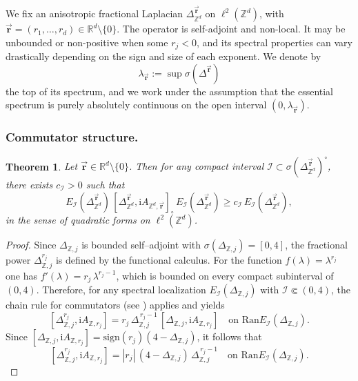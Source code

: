 \documentclass[10pt]{amsart} %
\newcommand{\Z}{{\mathbb{Z}}}
\newcommand{\1}{{\mathbb{I}}}
\newcommand{\Ic}{\mathcal{I}}
\newcommand{\Ran}{\mathrm{Ran}}
\numberwithin{equation}{section}
\newtheorem{theorem}{Theorem}[section]%
\begin{document}
We fix an anisotropic fractional Laplacian \( \Delta_{\mathbb{Z}^d}^{\vec{\mathbf{r}}} \) on \( \ell^2(\mathbb{Z}^d) \), with \( \vec{\mathbf{r}} = (r_1, \dots, r_d) \in \mathbb{R}^d \setminus \{0\} \). The operator is self-adjoint and non-local. It may be unbounded or non-positive when some \( r_j < 0 \), and its spectral properties can vary drastically depending on the sign and size of each exponent. We denote by
\[
\lambda_{\vec{\mathbf{r}}} := \sup \sigma(\Delta^{\vec{\mathbf{r}}})
\]
the top of its spectrum, and we work under the assumption that the essential spectrum is purely absolutely continuous on the open interval \( (0, \lambda_{\vec{\mathbf{r}}}) \).\\
\subsubsection{Commutator structure.}

\begin{theorem}\label{thm:mourre_Zd}
Let \( \vec{\mathbf{r}} \in \mathbb{R}^d \setminus \{0\} \).
Then for any compact interval \( \mathcal{I} \subset \sigma(\Delta_{\Z^d}^{\vec{\mathbf{r}}})^\circ \),
there exists \( c_{\mathcal{I}} > 0 \) such that
\[
E_{\mathcal{I}}(\Delta_{\Z^d}^{\vec{\mathbf{r}}})\, [\Delta_{\Z^d}^{\vec{\mathbf{r}}}, \mathrm{i}A_{\mathbb{Z}^d,\vec{\mathbf{r}}}]_\circ\, E_{\mathcal{I}}(\Delta_{\Z^d}^{\vec{\mathbf{r}}})
\ge c_{\mathcal{I}}\, E_{\mathcal{I}}(\Delta_{\Z^d}^{\vec{\mathbf{r}}}),
\]
in the sense of quadratic forms on \( \ell^2(\mathbb{Z}^d) \).
\end{theorem}

\begin{proof}
Since $ \Delta_{\Z,j} $ is bounded self--adjoint with $ \sigma(\Delta_{\Z,j}) = [0,4] $,
the fractional power $ \Delta_{\Z,j}^{r_j} $ is defined by the functional calculus.
For the function $f(\lambda)=\lambda^{r_j}$ one has $f'(\lambda)=r_j\,\lambda^{r_j-1}$,
which is bounded on every compact subinterval of $(0,4)$.
Therefore, for any spectral localization $E_{\Ic}(\Delta_{\Z,j})$ with
$\Ic \Subset (0,4)$, the chain rule for commutators
(see \cite[Prop.~5.1.5]{ABG}) applies and yields
\[
[\Delta_{\Z,j}^{r_j}, \mathrm{i}A_{\mathbb{Z},r_j}]
= r_j\, \Delta_{\Z,j}^{\,r_j-1}\,[\Delta_{\Z,j},\mathrm{i}A_{\mathbb{Z},r_j}]
\quad\text{on }\Ran E_{\Ic}(\Delta_{\Z,j}).
\]
Since $[\Delta_{\Z,j},\mathrm{i}A_{\mathbb{Z},r_j}] = \mathrm{sign}(r_j)(4-\Delta_{\Z,j})$,
it follows that
\[
[\Delta_{\Z,j}^{r_j}, \mathrm{i}A_{\mathbb{Z},r_j}]
= |r_j|\,(4-\Delta_{\Z,j})\,\Delta_{\Z,j}^{\,r_j-1}
\quad\text{on }\Ran E_{\Ic}(\Delta_{\Z,j}).
\]

\end{proof}
\end{document}
